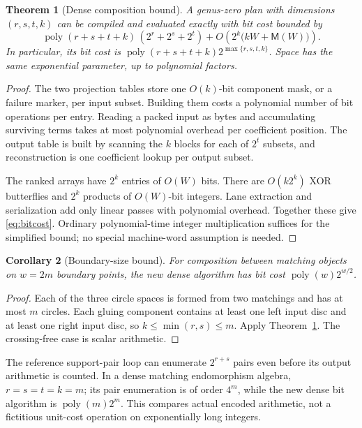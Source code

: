 \documentclass[11pt,letterpaper]{article}
\newtheorem{theorem}{Theorem}[section]
\newtheorem{corollary}[theorem]{Corollary}
\theoremstyle{definition}
\theoremstyle{remark}
\newcommand{\poly}{\operatorname{poly}}
\begin{document}
\begin{theorem}[Dense composition bound]
\label{thm:bitcost}
A genus-zero plan with dimensions $(r,s,t,k)$ can be compiled and evaluated
exactly with bit cost bounded by
\begin{equation}
 \poly(r+s+t+k)\,(2^r+2^s+2^t)
 +O\!\left(2^k\bigl(kW+\mathsf M(W)\bigr)\right).
 \label{eq:bitcost}
\end{equation}
In particular, its bit cost is
$\poly(r+s+t+k)2^{\max\{r,s,t,k\}}$. Space has the same exponential parameter,
up to polynomial factors.
\end{theorem}
\begin{proof}
The two projection tables store one $O(k)$-bit component mask, or a failure
marker, per input subset. Building them costs a polynomial number of bit
operations per entry. Reading a packed input as bytes and accumulating
surviving terms takes at most polynomial overhead per coefficient position.
The output table is built by scanning the $k$ blocks for each of $2^t$
subsets, and reconstruction is one coefficient lookup per output subset.

The ranked arrays have $2^k$ entries of $O(W)$ bits. There are $O(k2^k)$
XOR butterflies and $2^k$ products of $O(W)$-bit integers. Lane extraction
and serialization add only linear passes with polynomial overhead.
Together these give \eqref{eq:bitcost}. Ordinary polynomial-time integer
multiplication suffices for the simplified bound; no special machine-word
assumption is needed.
\end{proof}

\begin{corollary}[Boundary-size bound]
\label{cor:width}
For composition between matching objects on $w=2m$ boundary points, the
new dense algorithm has bit cost $\poly(w)2^{w/2}$.
\end{corollary}
\begin{proof}
Each of the three circle spaces is formed from two matchings and has at
most $m$ circles. Each gluing component contains at least one left input
disc and at least one right input disc, so $k\leq\min(r,s)\leq m$.
Apply Theorem~\ref{thm:bitcost}. The crossing-free case is scalar arithmetic.
\end{proof}

The reference support-pair loop can enumerate $2^{r+s}$ pairs even before
its output arithmetic is counted. In a dense matching endomorphism algebra,
$r=s=t=k=m$; its pair enumeration is of order $4^m$, while the new dense
bit algorithm is $\poly(m)2^m$. This compares actual encoded arithmetic,
not a fictitious unit-cost operation on exponentially long integers.
\end{document}
